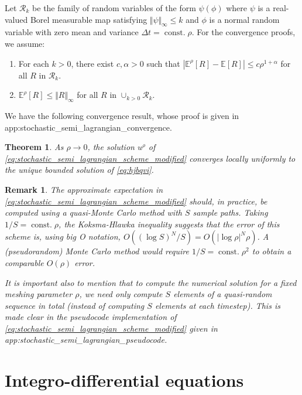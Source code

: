 \documentclass[12pt]{article}
\newcounter{dummy}
\newtheorem{rem}[dummy]{Remark}
\newtheorem{theorem}[dummy]{Theorem}
\begin{document}
Let $\mathcal{R}_{k}$ be the family of random variables of the form
$\psi(\phi)$ where $\psi$ is a real-valued Borel measurable map
satisfying $\Vert\psi\Vert_{\infty}{\leqslant} k$ and $\phi$ is a normal
random variable with zero mean and variance $\Delta t={\operatorname{const.}}\rho$.
For the convergence proofs, we assume:
\begin{enumerate}[label=(H\arabic*),start=10]
\item \label{enu:approximate_expectation_1}For each $k>0$, there exist
$c,\alpha>0$ such that $|\mathbb{E}^{\rho}[R]-\mathbb{E}[R]|{\leqslant} c\rho^{1+\alpha}$
for all $R$ in $\mathcal{R}_{k}$.
\item \label{enu:approximate_expectation_2}$\mathbb{E}^{\rho}[R]{\leqslant}\Vert R\Vert_{\infty}$
for all $R$ in $\cup_{k>0}\mathcal{R}_{k}$.
\end{enumerate}

We have the following convergence result, whose proof is given
in {\prettyref}{app:stochastic_semi_lagrangian_convergence}.
\begin{theorem}
\label{thm:stochastic_semi_lagrangian_convergence}As $\rho\rightarrow0$,
the solution $u^{\rho}$ of \eqref{eq:stochastic_semi_lagrangian_scheme_modified}
converges locally uniformly to the unique bounded solution of \eqref{eq:hjbqvi}.
\end{theorem}
\begin{rem}\label{rem:quasi_monte_carlo}The approximate expectation
in \eqref{eq:stochastic_semi_lagrangian_scheme_modified} should,
in practice, be computed using a quasi-Monte Carlo method with $S$
sample paths. Taking $1/S={\operatorname{const.}}\rho$, the Koksma-Hlawka inequality
\cite{MR1365433} suggests that the error of this scheme is, using
big O notation, $O((\log S)^{N}/S)=O(|\log\rho|^{N}\rho)$. A (pseudorandom)
Monte Carlo method would require $1/S={\operatorname{const.}}\rho^{2}$ to obtain a
comparable $O(\rho)$ error.

It is important also to mention that to compute the numerical solution
for a fixed meshing parameter $\rho$, we need only compute $S$ elements
of a quasi-random sequence in total (instead of computing $S$ elements
at each timestep). This is made clear in the pseudocode implementation
of \eqref{eq:stochastic_semi_lagrangian_scheme_modified} given in
{\prettyref}{app:stochastic_semi_lagrangian_pseudocode}.\end{rem}

\section{\label{sec:integro_differential_equations}Integro-differential equations}
\end{document}

